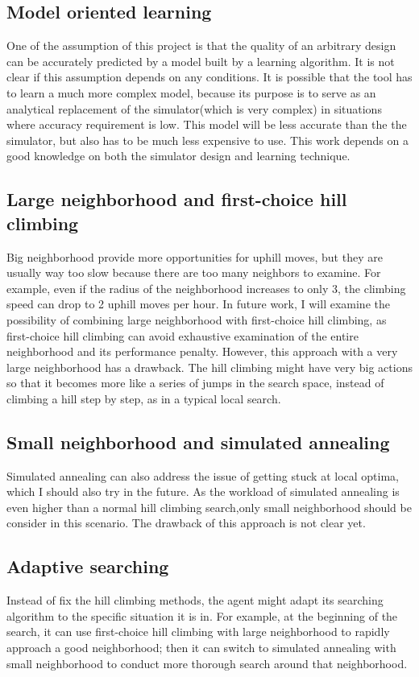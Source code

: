\documentclass[12pt]{article}
\theoremstyle{definition}
\begin{document}
\subsection{Model oriented learning}
One of the assumption of this project is that the quality of an arbitrary design can be accurately predicted by a model built by a learning algorithm. It is not clear if this assumption depends on any conditions. It is possible that the tool has to learn a much more complex model, because its purpose is to serve as an analytical replacement of the simulator(which is very complex) in situations where accuracy requirement is low. This model will be less accurate than the the simulator, but also has to be much less expensive to use. This work depends on a good knowledge on both the simulator design and learning technique.
\subsection{Large neighborhood and first-choice hill climbing}
Big neighborhood provide more opportunities for uphill moves, but they are usually way too slow because there are too many neighbors to examine. For example, even if the radius of the neighborhood increases to only 3, the climbing speed can drop to 2 uphill moves per hour. In future work, I will examine the possibility of combining large neighborhood with first-choice hill climbing, as first-choice hill climbing can avoid exhaustive examination of the entire neighborhood and its performance penalty. However, this approach with a very large neighborhood has a drawback. The hill climbing might have very big actions so that it becomes more like a series of jumps in the search space, instead of climbing a hill step by step, as in a typical local search.
\subsection{Small neighborhood and simulated annealing}
Simulated annealing can also address the issue of getting stuck at local optima, which I should also try in the future. As the workload of simulated annealing is even higher than a normal hill climbing search,only small neighborhood should be consider in this scenario. The drawback of this approach is not clear yet.
\subsection{Adaptive searching}
Instead of fix the hill climbing methods, the agent might adapt its searching algorithm to the specific situation it is in. For example, at the beginning of the search, it can use first-choice hill climbing with large neighborhood to rapidly approach a good neighborhood; then it can switch to simulated annealing with small neighborhood to conduct more thorough search around that neighborhood.
\end{document}
